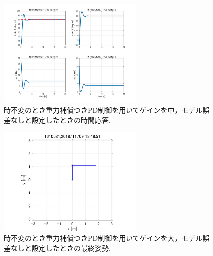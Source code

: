 \documentclass[twocolumn, 10pt,a4j]{jsarticle}
\begin{document}
    \begin{figure}[H]
      \begin{center}
        \includegraphics[width=7cm]{../img/img/kansetu_juryoku_hosyou_PD_zifuhen_chu_no_model_gosa_zikan_auto.jpg}
        \caption{時不変のとき重力補償つきPD制御を用いてゲインを中，モデル誤差なしと設定したときの時間応答.}
      \end{center}
    \end{figure}
    \begin{figure}[H]
      \begin{center}
        \includegraphics[width=7cm]{../img/img/kansetu_juryoku_hosyou_PD_zifuhen_large_no_model_gosa_saisyu_sisei.jpg}
        \caption{時不変のとき重力補償つきPD制御を用いてゲインを大，モデル誤差なしと設定したときの最終姿勢.}
      \end{center}
    \end{figure}
\end{document}

